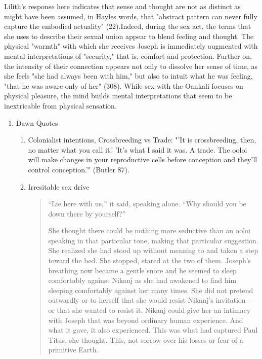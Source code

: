 \documentclass[11pt]{article}
\begin{document}
Lilith's response here indicates that sense and thought are not as
distinct as might have been assumed, in Hayles words, that "abstract
pattern can never fully capture the embodied actuality" (22).Indeed,
during the sex act, the terms that she uses to describe their sexual
union appear to blend feeling and thought. The physical "warmth" with
which she receives Joseph is immediately augmented with mental
interpretations of "security," that is, comfort and
protection. Further on, the intensity of their connection appears not
only to dissolve her sense of time, as she feels "she had always been
with him," but also to intuit what he was feeling, "that he was aware
only of her" (308). While sex with the Oankali focuses on physical
pleasure, the mind builds mental interpretations that seem to be
inextricable from physical sensation.


\begin{enumerate}
\item Dawn Quotes
\label{sec:orgdfa6b68}

\begin{enumerate}
\item Colonialist intentions, Crossbreeding vs Trade:
\label{sec:orgc05f5db}
"'It is crossbreeding, then, no matter what you call it.' 'It's what I
said it was. A trade. The ooloi will make changes in your reproductive
cells before conception and they’ll control conception.'" (Butler
87). 

\item Irresitable sex drive
\label{sec:orgb00f80f}
\begin{quote}
“Lie here with us,” it said, speaking alone. “Why should you be down
there by yourself?”

She thought there could be nothing more seductive than an ooloi
speaking in that particular tone, making that particular
suggestion. She realized she had stood up without meaning to and taken
a step toward the bed. She stopped, stared at the two of
them. Joseph’s breathing now became a gentle snore and he seemed to
sleep comfortably against Nikanj as she had awakened to find him
sleeping comfortably against her many times. She did not pretend
outwardly or to herself that she would resist Nikanj’s invitation—or
that she wanted to resist it.  Nikanj could give her an intimacy with
Joseph that was beyond ordinary human experience. And what it gave, it
also experienced. This was what had captured Paul Titus, she
thought. This, not sorrow over his losses or fear of a primitive
Earth.
\end{quote}
\end{enumerate}
\end{enumerate}
\end{document}
